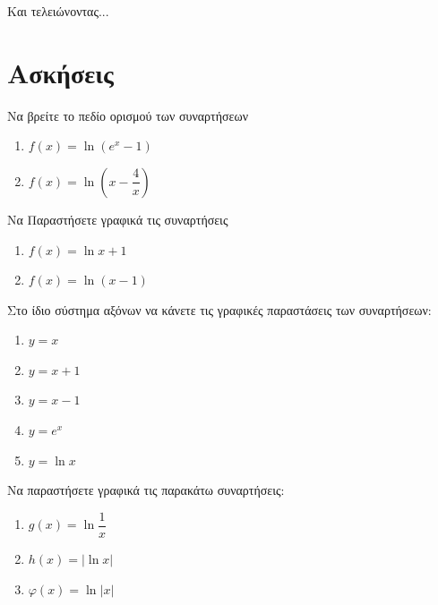 \documentclass{../presentation}
\begin{document}
\begin{frame}{Και τελειώνοντας...}

\end{frame}

\section{Ασκήσεις}
\begin{askisi}
  Να βρείτε το πεδίο ορισμού των συναρτήσεων
  \begin{enumerate}
    \item<1-> $f(x)=\ln (e^x-1)$
    \item<2-> $f(x)=\ln \left( x-\dfrac{4}{x} \right) $
  \end{enumerate}


\end{askisi}

\begin{askisi}
  Να Παραστήσετε γραφικά τις συναρτήσεις
  \begin{enumerate}
    \item<1-> $f(x)=\ln x+1$
    \item<2-> $f(x)=\ln (x-1)$
  \end{enumerate}


\end{askisi}

\begin{askisi}
  Στο ίδιο σύστημα αξόνων να κάνετε τις γραφικές παραστάσεις των συναρτήσεων:
  \begin{enumerate}
    \item $y=x$
    \item $y=x+1$
    \item $y=x-1$
    \item $y=e^x$
    \item $y=\ln x$
  \end{enumerate}


\end{askisi}

\begin{askisi}
  Να παραστήσετε γραφικά τις παρακάτω συναρτήσεις:
  \begin{enumerate}
    \item<1-> $g(x)=\ln \dfrac{1}{x}$
    \item<2-> $h(x)=|\ln x|$
    \item<3-> $φ(x)=\ln |x|$
  \end{enumerate}


\end{askisi}
\end{document}
